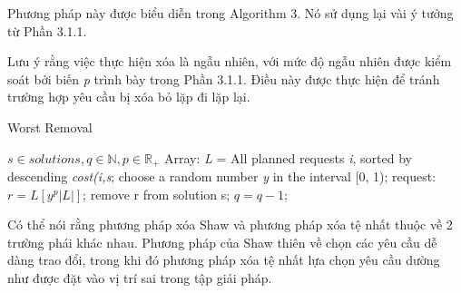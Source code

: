 Phương pháp này được biểu diễn trong Algorithm 3. Nó sử dụng lại vài ý tưởng từ Phần 3.1.1.

Lưu ý rằng việc thực hiện xóa là ngẫu nhiên, với mức độ ngẫu nhiên được kiểm soát bởi biến \textit{p} trình bày trong Phần 3.1.1. Điều này được thực hiện để tránh trường hợp yêu cầu bị xóa bỏ lặp đi lặp lại.

\begin{algorithm}
    \caption{Worst Removal} 
	\begin{algorithmic}[1]
        \Require $s \in {solutions}, q \in \mathbb{N}, p \in \mathbb{R}_{+}$
		  \State Array: \textit{L} = All planned requests \textit{i}, sorted by descending \textit{cost(i,s};
            \State choose a random number \textit{y} in the interval [0, 1);
            \State request: $r = L\left[ y^p |L| \right]$;
            \State remove r from solution s;
            \State $q = q-1$;
        \EndWhile
	\end{algorithmic} 
\end{algorithm}

Có thể nói rằng phương pháp xóa Shaw và phương pháp xóa tệ nhất thuộc về 2 trường phái khác nhau. Phương pháp của Shaw thiên về chọn các yêu cầu dễ dàng trao đổi, trong khi đó phương pháp xóa tệ nhất lựa chọn yêu cầu dường như được đặt vào vị trí sai trong tập giải pháp.
